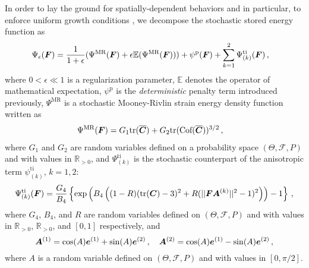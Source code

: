 In order to lay the ground for spatially-dependent behaviors and in particular, to enforce uniform growth conditions \cite{STABER201894}, we decompose the stochastic stored energy function as
\begin{align}
    \Psi_{\epsilon}(\boldsymbol{F}) & = \frac{1}{1+\epsilon}( \Psi^{\text{MR}}(\boldsymbol{F}) + \epsilon \mathbb{E}(\Psi^{\text{MR}}(\boldsymbol{F}))) + \psi^\text{p}(\boldsymbol{F}) + \sum_{k=1}^{2} \Psi_{(k)}^\text{ti}(\boldsymbol{F})\,,\label{eq:regularized-SEF-homogeneous}
\end{align}
where $0 < \epsilon \ll 1$ is a regularization parameter, $\mathbb{E}$ denotes the operator of mathematical expectation, $\psi^\text{p}$ is the \textit{deterministic} penalty term introduced previously, $\Psi^{\text{MR}}$ is a stochastic Mooney-Rivlin strain energy density function written as
\begin{align}
    \Psi^{\text{MR}}(\boldsymbol{F}) &= G_1 \textnormal{tr}(\overline{\boldsymbol{C}}) + G_2 \textnormal{tr}(\text{Cof}(\overline{\boldsymbol{C}}))^{3/2}\,, \label{eq: MR-Sto} 
\end{align}
where $G_1$ and $G_2$ are random variables defined on a probability space $(\Theta, \mathcal{F}, P)$ and with values in $\mathbb{R}_{> 0}$, and $\Psi_{(k)}^\text{ti}$ is the stochastic counterpart of the anisotropic term $\psi_{(k)}^\text{ti}$, $k = 1,2$:
\begin{align}
    \Psi_{(k)}^\text{ti}(\boldsymbol{F}) = \frac{G_4}{B_4} \left\{ \exp \left(B_4 \left( (1-R)(\textnormal{tr}(\boldsymbol{C})-3)^2 + R ( \vert \vert \boldsymbol{F} \boldsymbol{A}^{(k)} \vert \vert ^2 - 1 )^2 \right) \right) - 1\right\}\,, \label{eq: psi tissue-Sto}
\end{align}  
where $G_4$, $B_4$, and $R$ are random variables defined on $(\Theta, \mathcal{F}, P)$ and with values in $\mathbb{R}_{> 0}$, $\mathbb{R}_{> 0}$, and $[0,1]$ respectively, and 
\begin{equation}    
    \boldsymbol{A}^{(1)} = \cos(A) \boldsymbol{e}^{(1)} + \sin(A)\boldsymbol{e}^{(2)}\,, \quad \boldsymbol{A}^{(2)} = \cos(A) \boldsymbol{e}^{(1)} - \sin(A)\boldsymbol{e}^{(2)}\,,
\end{equation}
where $A$ is a random variable defined on $(\Theta, \mathcal{F}, P)$ and with values in $[0, \pi/2]$. 

